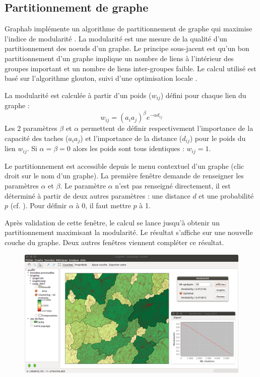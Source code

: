 \documentclass{article}
\begin{document}
\subsection{Partitionnement de graphe}

Graphab implémente un algorithme de partitionnement de graphe qui maximise l'indice de modularité \cite{Newman2006}. La modularité est une mesure de la qualité d'un partitionnement des noeuds d'un graphe. Le principe sous-jacent est qu'un bon partitionnement d'un graphe implique un nombre de liens à l'intérieur des groupes important et un nombre de liens inter-groupes faible. Le calcul utilisé est basé sur l'algorithme glouton, suivi d'une optimisation locale \cite{Brandes2008}.

La modularité est calculée à partir d'un poids ($w_{ij}$) défini pour chaque lien du graphe :
$$w_{ij} = (a_i a_j)^\beta e^{-\alpha d_{ij}}$$
Les 2 paramètres $\beta$ et $\alpha$ permettent de définir respectivement l'importance de la capacité des taches ($a_i a_j$) et l'importance de la distance ($d_{ij}$) pour le poids du lien $w_{ij}$. Si $\alpha = \beta = 0$ alors les poids sont tous identiques : $w_{ij} = 1$.

Le partitionnement est accessible depuis le menu contextuel d'un graphe (clic droit sur le nom d'un graphe). La première fenêtre demande de renseigner les paramètres $\alpha$ et $\beta$. Le paramètre $\alpha$ n'est pas renseigné directement, il est déterminé à partir de deux autres paramètres : une distance $d$ et une probabilité $p$ (cf. ). Pour définir $\alpha$ à 0, il faut mettre $p$ à 1. 

Après validation de cette fenêtre, le calcul se lance jusqu'à obtenir un partitionnement maximisant la modularité. Le résultat s'affiche sur une nouvelle couche du graphe. Deux autres fenêtres viennent compléter ce résultat. 

\begin{figure}[H]
	\includegraphics[scale=0.36]{img/manual-fr_cluster.png} 
\end{figure}
\end{document}
